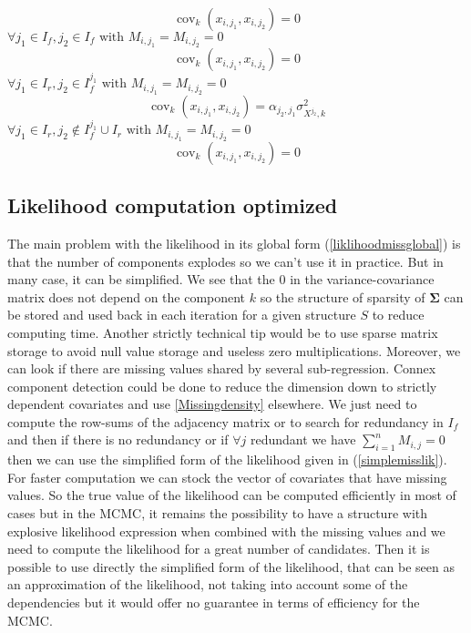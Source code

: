 \documentclass[12pt,a4paper]{report}
\begin{document}
	\begin{equation}
	\operatorname{cov}_{k}(x_{i,j_1},x_{i,j_2})=0
\end{equation}
	$\forall j_1 \in I_f, j_2 \in I_f \textrm{ with } M_{i,j_1}=M_{i,j_2}=0$
	\begin{equation}
	\operatorname{cov}_{k}(x_{i,j_1},x_{i,j_2})=0
\end{equation}
	$\forall j_1 \in I_r, j_2 \in I_f^{j_1} \textrm{ with } M_{i,j_1}=M_{i,j_2}=0$
	\begin{equation}
	\operatorname{cov}_{k}(x_{i,j_1},x_{i,j_2})= \alpha_{j_2,j_1}\sigma_{X^{j_2},k}^2
\end{equation}
$\forall j_1 \in I_r, j_2 \notin I_f^{j_1}\cup I_r \textrm{ with } M_{i,j_1}=M_{i,j_2}=0$
	\begin{equation}
	\operatorname{cov}_{k}(x_{i,j_1},x_{i,j_2})= 0
\end{equation}
	\subsection{Likelihood computation optimized}
	The main problem with the likelihood in its global form (\ref{liklihoodmissglobal}) is that the number of components explodes so we can't use it in practice. But in many case, it can be simplified.
We see that the $0$ in the variance-covariance matrix does not depend on the component $k$ so the structure of sparsity of $\boldsymbol{\Sigma}$ can be stored and used back in each iteration for a given structure $S$ to reduce computing time.  Another strictly technical tip would be to use sparse matrix storage to avoid null value storage and useless zero multiplications.
		Moreover, we can look if there are missing values shared by several sub-regression. 
		Connex component detection could be done to reduce the dimension down to strictly dependent covariates and use \ref{Missingdensity} elsewhere.
		We just need to compute the  row-sums of the adjacency matrix or to search for redundancy in $I_f$ and then if there is no redundancy or if $\forall j$ redundant we have $\sum_{i=1}^nM_{i,j}=0$ then we can use the simplified form of the likelihood given in (\ref{simplemisslik}). For faster computation we can stock the vector of covariates that have missing values.
		So the true value of the likelihood can be computed efficiently in most of cases but in the MCMC, it remains the possibility to have a structure with explosive likelihood expression when combined with the missing values and we need to compute the likelihood for a great number of candidates. Then it is possible to use directly the simplified form of the likelihood, that can be seen as an approximation of the likelihood, not taking into account some of the dependencies but it would offer no guarantee in terms of efficiency for the MCMC. %
\end{document}
